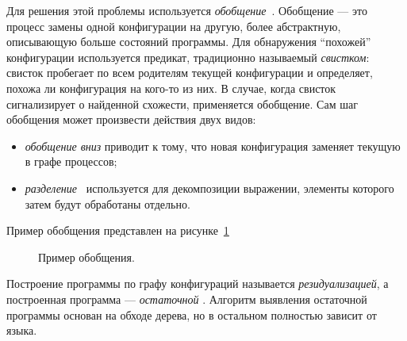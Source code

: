 Для решения этой проблемы используется \emph{обобщение}~\cite{scGen}. Обобщение --- это процесс
замены одной конфигурации на другую, более абстрактную, описывающую больше состояний
программы. Для обнаружения ``похожей'' конфигурации используется предикат,
традиционно называемый \emph{свистком}: свисток пробегает по всем
родителям текущей конфигурации и определяет, похожа ли конфигурация на кого-то из них.
В случае, когда свисток сигнализирует о найденной схожести, применяется обобщение.
Сам шаг обобщения может произвести действия двух видов:
\begin{itemize}
\item \emph{обобщение вниз} приводит к тому, что новая конфигурация заменяет текущую в графе процессов;
\item \emph{разделение}~ используется для декомпозиции выражении, элементы которого затем
будут обработаны отдельно.
\end{itemize}
Пример обобщения представлен на рисунке~\ref{fig:pgraphGenExample}
\begin{figure}[h!]
\center
{}


\caption{Пример обобщения.}
\label{fig:pgraphGenExample}
\end{figure}

Построение программы по графу конфигураций называется \emph{резидуализацией}, а
построенная программа --- \emph{остаточной} .
Алгоритм выявления остаточной программы основан на обходе дерева, но
в остальном полностью зависит от языка.
